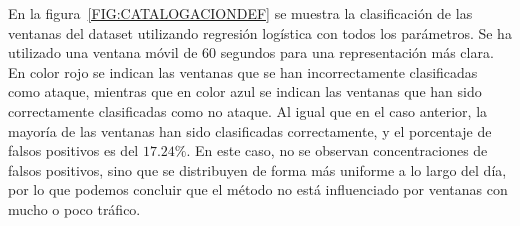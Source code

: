 En la figura~\ref{FIG:CATALOGACIONDEF} se muestra la clasificación de las ventanas del dataset utilizando regresión logística con todos los parámetros. Se ha utilizado una ventana móvil de 60 segundos para una representación más clara.
En color rojo se indican las ventanas que se han incorrectamente clasificadas como ataque, mientras que en color azul se indican las ventanas que han sido correctamente clasificadas como no ataque.
Al igual que en el caso anterior, la mayoría de las ventanas han sido clasificadas correctamente, y el porcentaje de falsos positivos es del $17.24\%$.
En este caso, no se observan concentraciones de falsos positivos, sino que se distribuyen de forma más uniforme a lo largo del día, por lo que podemos concluir que el método no está influenciado por ventanas con mucho o poco tráfico.
